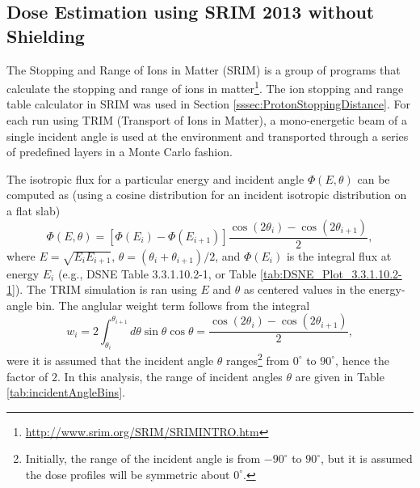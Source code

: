 \documentclass{hitec}
\begin{document}
\subsection[using SRIM 2013]{Dose Estimation using SRIM 2013 without Shielding}\label{ssec:SRIMnoShielding}

The Stopping and Range of Ions in Matter (SRIM) \citep{ziegler2009srim} is a group of programs that calculate the stopping and range of ions in matter\footnote{\url{http://www.srim.org/SRIM/SRIMINTRO.htm}}. The ion stopping and range table calculator in SRIM was used in Section \ref{sssec:ProtonStoppingDistance}. For each run using TRIM (Transport of Ions in Matter), a mono-energetic beam of a single incident angle is used at the environment and transported through a series of predefined layers in a Monte Carlo fashion.

The isotropic flux for a particular energy and incident angle $\Phi(E,\theta)$ can be computed as (using a cosine distribution for an incident isotropic distribution on a flat slab)
\begin{equation}
\Phi(E,\theta) = [\Phi(E_i) - \Phi(E_{i+1})] \frac{\cos(2\theta_i) - \cos(2\theta_{i+1})}{2},
\end{equation}
where $E = \sqrt{E_i E_{i+1}}$, $\theta = (\theta_i + \theta_{i+1})/2$, and $\Phi(E_i)$ is the integral flux at energy $E_i$ (e.g., DSNE Table 3.3.1.10.2-1, or Table \ref{tab:DSNE_Plot_3.3.1.10.2-1}). The TRIM simulation is ran using $E$ and $\theta$ as centered values in the energy-angle bin. The anglular weight term follows from the integral
\begin{equation}
w_i = 2\int_{\theta_i}^{\theta_{i+1}}d\theta\sin\theta\cos\theta = \frac{\cos(2\theta_i) - \cos(2\theta_{i+1})}{2},
\end{equation}
were it is assumed that the incident angle $\theta$ ranges\footnote{Initially, the range of the incident angle is from $-90^\circ$ to $90^\circ$, but it is assumed the dose profiles will be symmetric about $0^\circ$.} from $0^\circ$ to $90^\circ$, hence the factor of $2$. In this analysis, the range of incident angles $\theta$ are given in Table \ref{tab:incidentAngleBins}.
\end{document}
